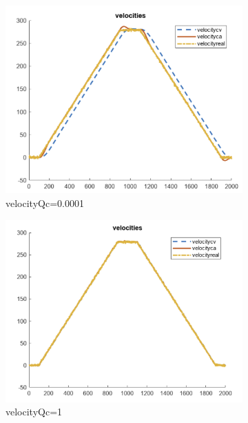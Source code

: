\begin{figure}[H]
    \centering
    \begin{subfigure}[b]{0.3\textwidth}
        \includegraphics[width=\textwidth]{images/velocityQc=0.0001.png}
        \caption{velocityQc=0.0001}
        \label{velocityQc=0.0001}
    \end{subfigure}
    \begin{subfigure}[b]{0.3\textwidth}
        \includegraphics[width=\textwidth]{images/velocityQc=1.png}
        \caption{velocityQc=1}
        \label{fig:velocityQc=1}
    \end{subfigure}
    \begin{subfigure}[b]{0.3\textwidth}

\end{subfigure}
\end{figure}
